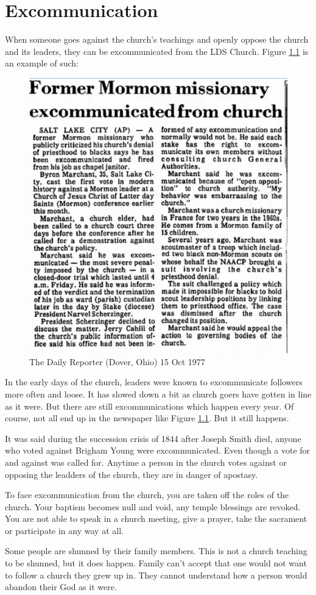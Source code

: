 \chapter{Excommunication}

When someone goes against the church's teachings and openly oppose the church and its
leaders, they can be excommunicated from the LDS Church. Figure \ref{fig:ex1} is an 
example of such:

\begin{figure}[h!]
  \centering
  \includegraphics[width=0.4\linewidth]{articles/images/ex.png}
  \caption{The Daily Reporter (Dover, Ohio) 15 Oct 1977}
  \label{fig:ex1}
\end{figure}

In the early days of the church, leaders were known to excommunicate followers more
often and loose. It has slowed down a bit as church goers have gotten in line as it
were. But there are still excommunications which happen every year. Of course, not 
all end up in the newspaper like Figure \ref{fig:ex1}. But it still happens.

It was said during the succession crisis of 1844 after Joseph Smith died, anyone who
voted against Brigham Young were excommunicated. Even though a vote for and against
was called for. Anytime a person in the church votes against or opposing the leadders
of the church, they are in danger of apostasy.

To face excommunication from the church, you are taken off the roles of the church.
Your baptism becomes null and void, any temple blessings are revoked. You are not
able to speak in a church meeting, give a prayer, take the sacrament or participate
in any way at all.

Some people are shunned by their family members. This is not a church teaching to be
shunned, but it does happen. Family can't accept that one would not want to follow a
church they grew up in. They cannot understand how a person would abandon their God
as it were.

